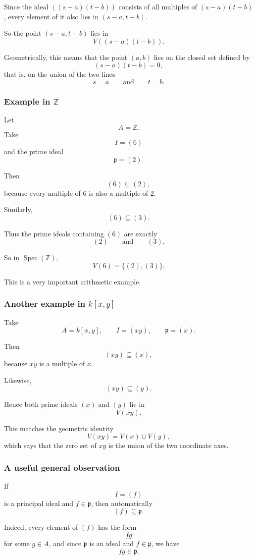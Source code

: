 \documentclass[12pt,a4paper]{article}
\theoremstyle{notespace}
\newcommand{\Spec}{\operatorname{Spec}}
\newcommand{\mf}{\mathfrak}
\theoremstyle{definition}
\begin{document}
Since the ideal \(((s-a)(t-b))\) consists of all multiples of \((s-a)(t-b)\), every element of it also lies in \((s-a,t-b)\).

So the point \((s-a,t-b)\) lies in
\[
V((s-a)(t-b)).
\]

Geometrically, this means that the point \((a,b)\) lies on the closed set defined by
\[
(s-a)(t-b)=0,
\]
that is, on the union of the two lines
\[
s=a
\qquad\text{and}\qquad
t=b.
\]

\subsubsection{Example in \(\mathbb Z\)}

Let
\[
A=\mathbb Z.
\]
Take
\[
I=(6)
\]
and the prime ideal
\[
\mf p=(2).
\]

Then
\[
(6)\subseteq (2),
\]
because every multiple of \(6\) is also a multiple of \(2\).

Similarly,
\[
(6)\subseteq (3).
\]

Thus the prime ideals containing \((6)\) are exactly
\[
(2)\qquad\text{and}\qquad (3).
\]

So in \(\Spec(\mathbb Z)\),
\[
V(6)=\{(2),(3)\}.
\]

This is a very important arithmetic example.

\subsubsection{Another example in \(k[x,y]\)}

Take
\[
A=k[x,y],
\qquad
I=(xy),
\qquad
\mf p=(x).
\]

Then
\[
(xy)\subseteq (x),
\]
because \(xy\) is a multiple of \(x\).

Likewise,
\[
(xy)\subseteq (y).
\]

Hence both prime ideals \((x)\) and \((y)\) lie in
\[
V(xy).
\]

This matches the geometric identity
\[
V(xy)=V(x)\cup V(y),
\]
which says that the zero set of \(xy\) is the union of the two coordinate axes.

\subsubsection{A useful general observation}

If
\[
I=(f)
\]
is a principal ideal and \(f\in \mf p\), then automatically
\[
(f)\subseteq \mf p.
\]

Indeed, every element of \((f)\) has the form
\[
fg
\]
for some \(g\in A\), and since \(\mf p\) is an ideal and \(f\in \mf p\), we have
\[
fg\in \mf p.
\]
\end{document}
